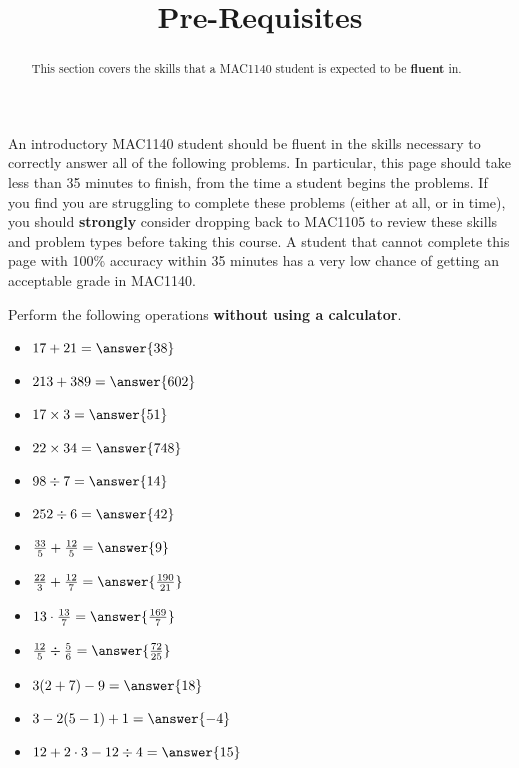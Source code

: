 \documentclass{ximera}
\title{Pre-Requisites}
\begin{document}
\begin{abstract}
This section covers the skills that a MAC1140 student is expected to be \textbf{fluent} in.
\end{abstract}
\maketitle

An introductory MAC1140 student should be fluent in the skills necessary to correctly answer all of the following problems. In particular, this page should take less than 35 minutes to finish, from the time a student begins the problems. If you find you are struggling to complete these problems (either at all, or in time), you should \textbf{strongly} consider dropping back to MAC1105 to review these skills and problem types before taking this course. A student that cannot complete this page with 100\% accuracy within 35 minutes has a very low chance of getting an acceptable grade in MAC1140.

\begin{problem}%
    Perform the following operations \textbf{without using a calculator}.
    \begin{itemize}
        \item $17 + 21 = \answer{38}$
        \item $213 + 389 = \answer{602}$
        \item $17 \times 3 = \answer{51}$
        \item $22 \times 34 = \answer{748}$
        \item $98 \div 7 = \answer{14}$
        \item $252 \div 6 = \answer{42}$
        \item $\frac{33}{5} + \frac{12}{5} = \answer{9}$
        \item $\frac{22}{3} + \frac{12}{7} = \answer{\frac{190}{21}}$
        \item $13 \cdot \frac{13}{7} = \answer{\frac{169}{7}}$
        \item $\frac{12}{5} \div \frac{5}{6} = \answer{\frac{72}{25}}$
        \item $3(2 + 7) - 9 = \answer{18}$
        \item $3 - 2(5 - 1) + 1 = \answer{-4}$
        \item $12 + 2\cdot 3 - 12\div 4 = \answer{15}$
    \end{itemize}
\end{problem}
\end{document}
